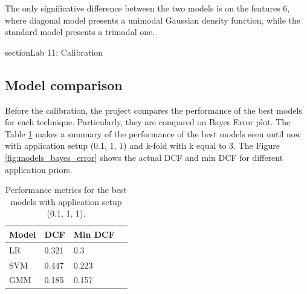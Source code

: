 \documentclass{article}
\begin{document}
The only significative difference between the two models is on the features 6, where diagonal model presents a unimodal Gaussian density function, while the standard model presents a trimodal one. 

section{Lab 11: Calibration}
\label{sec:calibration}

\subsection{Model comparison}
Before the calibration, the project compares the performance of the best models for each technique. Particularly, they are compared on Bayes Error plot. The Table \ref{tab:models_performance} makes a summary of the performance of the best models seen until now with application setup (0.1, 1, 1) and k-fold with k equal to 3. The Figure \ref{fig:models_bayes_error} shows the actual DCF and min DCF for different application priors.

\begin{table}[ht]
    \centering
    \begin{tabularx}{\textwidth}{lXXX}
        \toprule
        \textbf{Model} & \textbf{DCF} & \textbf{Min DCF} \\
        \midrule
        LR & 0.321 & 0.3 \\
        SVM & 0.447 & 0.223 \\
        GMM & 0.185 & 0.157 \\
        \bottomrule
    \end{tabularx}
    \caption{Performance metrics for the best models with application setup (0.1, 1, 1).}
    \label{tab:models_performance}
\end{table}
\end{document}
